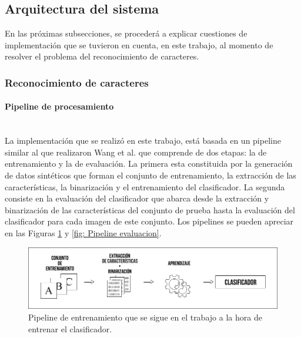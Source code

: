 \subsection{Arquitectura del sistema}
\label{subsection:impl_propia}

	En las próximas subsecciones, se procederá a explicar cuestiones de implementación que se tuvieron en cuenta, en este trabajo, al momento de resolver el problema del reconocimiento de caracteres.

	\subsubsection{Reconocimiento de caracteres}
		\label{subsubsection:recon-caracteres}
	
	
	\paragraph{Pipeline de procesamiento} ~\\

			La implementación que se realizó en este trabajo, está basada en un pipeline similar al que realizaron Wang et al. que comprende de dos etapas: la de entrenamiento y la de evaluación. La primera esta constituida por la generación de datos sintéticos que forman el conjunto de entrenamiento, la extracción de las características, la binarización y el entrenamiento del clasificador. La segunda consiste en la evaluación del clasificador que abarca desde la extracción y binarización de las características del conjunto de prueba hasta la evaluación del clasificador para cada imagen de este conjunto. Los pipelines se pueden apreciar en las Figuras \ref{fig: Pipeline entrenamiento} y \ref{fig: Pipeline evaluacion}.

			\begin{figure}[htbp]
				\centering
				\centerline{
					\includegraphics[scale=0.4]{img/pipeline_entrenamiento.jpg}
				}
				\caption[Pipeline de entrenamiento]{Pipeline de entrenamiento que se sigue en el trabajo a la hora de entrenar el clasificador.}
				\label{fig: Pipeline entrenamiento}
			\end{figure}
			
